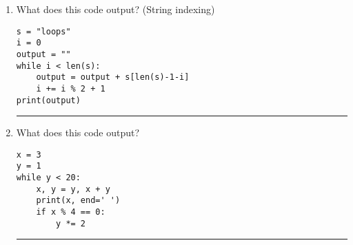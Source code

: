 \documentclass{article}
\begin{document}
\begin{enumerate}
    \item What does this code output? (String indexing)
    \begin{lstlisting}
s = "loops"
i = 0
output = ""
while i < len(s):
    output = output + s[len(s)-1-i]
    i += i % 2 + 1
print(output)
    \end{lstlisting}
    \rule{\linewidth}{0.4pt}
    
    \item What does this code output?
    \begin{lstlisting}
x = 3
y = 1
while y < 20:
    x, y = y, x + y
    print(x, end=' ')
    if x % 4 == 0:
        y *= 2
    \end{lstlisting}
    \rule{\linewidth}{0.4pt}
\end{enumerate}
\end{document}
